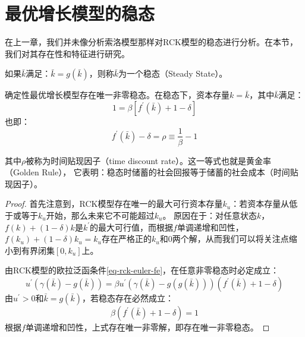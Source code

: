 
\section{最优增长模型的稳态}    \label{sec-rck-ss}

在上一章，我们并未像分析索洛模型那样对RCK模型的稳态进行分析。在本节，我们对其存在性和特征进行研究。

\begin{definition}[\textbf{稳态}]
    如果$\bar{k}$满足：$\bar{k}=g(\bar{k})$，则称$\bar{k}$为一个稳态（Steady State）。
\end{definition}

\begin{theorem}    \label{th-rck-ss-exist}
    确定性最优增长模型存在唯一非零稳态。在稳态下，资本存量$k=\bar{k}$，其中$\bar{k}$满足：
    \begin{equation*}
        1=\beta\left[f^{\prime}\left(\bar{k}\right)+1-\delta\right]
    \end{equation*}
    也即：
    \begin{equation} \label{eq-rck-ss-rho}
        f^{\prime}\left(\bar{k}\right)-\delta = \rho \equiv \frac{1}{\beta}-1
    \end{equation}
\end{theorem}

其中$\rho$被称为时间贴现因子（time discount rate）。这一等式也就是黄金率（Golden Rule），
它表明：稳态时储蓄的社会回报等于储蓄的社会成本（时间贴现因子）。
\begin{proof}
    首先注意到，RCK模型存在唯一的最大可行资本存量$k_u$：若资本存量从低于或等于$k_u$开始，那么未来它不可能超过$k_u$。
    原因在于：对任意状态$k$，$f(k)+(1-\delta)k$是$k^{\prime}$的最大可行值，而根据$f$单调递增和凹性，
    $f(k_u)+(1-\delta)k_u=k_u$存在严格正的$k_u$和$0$两个解，从而我们可以将关注点缩小到有界闭集$\left[0,k_u\right]$上。

    由RCK模型的欧拉泛函条件\cref{eq-rck-euler-fe}，在任意非零稳态时必定成立：
    \begin{equation*}
        u^{\prime}\left(\gamma\left(\bar{k}\right)-g\left(\bar{k}\right)\right)
            = \beta u^{\prime}\left(\gamma\left(\bar{k}\right) - 
                g\left(g(\bar{k})\right)\right)\left(f^{\prime}\left(\bar{k}\right)+1-\delta\right)
    \end{equation*}
    由$u^{\prime}>0$和$\bar{k} = g(\bar{k})$，若稳态存在必然成立：
    \begin{equation*}
        \beta\left(f^{\prime}\left(\bar{k}\right)+1-\delta\right) = 1
    \end{equation*}
    根据$f$单调递增和凹性，上式存在唯一非零解，即存在唯一非零稳态。
\end{proof}

